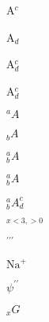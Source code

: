 \documentclass{article}
\begin{document}
A$^c$

A$_d$

A$^c_d$

A$_d^c$


$^aA$

$_bA$

$^a_bA$

$_b^aA$

$_b^aA^c_d$

$_{x<3,>0}$

$^{\prime\prime\prime}$

$\mathrm{Na}^+$ 

$\psi^{\prime\prime}$

$ _{\mathord{x}}\mathord{G} $
\end{document}
